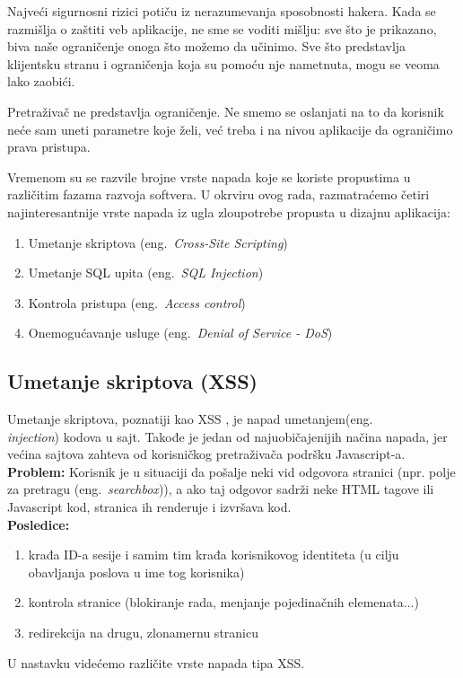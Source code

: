 \documentclass[a4paper]{article}
\begin{document}
Najveći sigurnosni rizici potiču iz nerazumevanja sposobnosti hakera. Kada se razmišlja o zaštiti veb aplikacije, ne sme se voditi mišlju: sve što je prikazano, biva naše ograničenje onoga što možemo da učinimo. Sve što predstavlja klijentsku stranu i ograničenja koja su pomoću nje nametnuta, mogu se veoma lako zaobići.

Pretraživač ne predstavlja ograničenje. Ne smemo se oslanjati na to da korisnik neće sam uneti parametre koje želi, već treba i na nivou aplikacije da ograničimo prava pristupa.

Vremenom su se razvile brojne vrste napada koje se koriste propustima u različitim fazama razvoja softvera. U okrviru ovog rada, razmatraćemo četiri najinteresantnije vrste napada iz ugla zloupotrebe propusta u dizajnu aplikacija:
\begin{enumerate}
	\item Umetanje skriptova (eng.~{\em Cross-Site Scripting})
	\item Umetanje SQL upita (eng.~{\em SQL Injection})
	\item Kontrola pristupa (eng.~{\em Access control})
	\item Onemogućavanje usluge (eng.~{\em Denial of Service - DoS})
\end{enumerate}
\subsection{Umetanje skriptova (XSS)}
Umetanje skriptova, poznatiji kao XSS \cite{XSS}, je napad umetanjem(eng.~{\em \\injection}) kodova u sajt. Takođe je jedan od najuobičajenijih načina napada, jer većina sajtova zahteva od korisničkog pretraživača podršku Javascript-a.\\
\textbf{Problem:} Korisnik je u situaciji da pošalje neki vid odgovora stranici (npr. polje za pretragu (eng.~{\em searchbox})), a ako taj odgovor sadrži neke HTML tagove ili Javascript kod, stranica ih renderuje i izvršava kod.\\
\textbf{Posledice:}
\begin{enumerate}
	\item krađa ID-a sesije i samim tim krađa korisnikovog identiteta (u cilju obavljanja poslova u ime tog korisnika)
	\item kontrola stranice (blokiranje rada, menjanje pojedinačnih elemenata...)
	\item redirekcija na drugu, zlonamernu stranicu
\end{enumerate}
U nastavku videćemo različite vrste napada tipa XSS.
\end{document}
